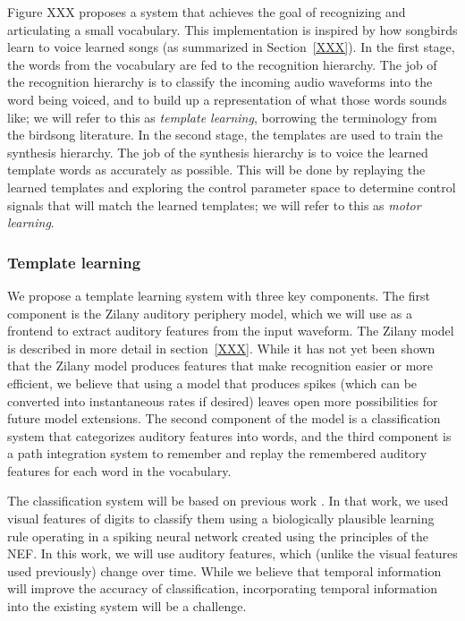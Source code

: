\documentclass{article}
\begin{document}
Figure XXX proposes a system that
achieves the goal of recognizing
and articulating a small vocabulary.
This implementation is inspired by
how songbirds learn to voice
learned songs
(as summarized in Section~\ref{XXX}).
In the first stage, the words from
the vocabulary are fed to the
recognition hierarchy.
The job of the recognition hierarchy
is to classify the incoming
audio waveforms into the word
being voiced,
and to build up a representation
of what those words sounds like;
we will refer to this as
\textit{template learning},
borrowing the terminology
from the birdsong literature.
In the second stage, the templates
are used to train the
synthesis hierarchy.
The job of the synthesis hierarchy
is to voice the learned template words
as accurately as possible.
This will be done by replaying
the learned templates and
exploring the control parameter space
to determine control signals
that will match the learned templates;
we will refer to this as
\textit{motor learning}.

\subsubsection{Template learning}
\label{subsec:template-learning}

We propose a template learning system
with three key components.
The first component is the Zilany
auditory periphery model,
which we will use as a frontend
to extract auditory features
from the input waveform.
The Zilany model is described in more detail
in section~\ref{XXX}.
While it has not yet been shown
that the Zilany model produces features
that make recognition
easier or more efficient,
we believe that using a model
that produces spikes
(which can be converted into
instantaneous rates if desired)
leaves open more possibilities
for future model extensions.
The second component of the model
is a classification system
that categorizes auditory features into words,
and the third component
is a path integration system
to remember and replay the
remembered auditory features
for each word in the vocabulary.

The classification system will be based
on previous work \citep{XXXCogSci}.
In that work, we used visual features
of digits to classify them
using a biologically plausible learning rule
operating in a spiking neural network
created using the principles of the NEF.
In this work, we will use auditory features,
which (unlike the visual features used previously)
change over time.
While we believe that temporal information
will improve the accuracy of classification,
incorporating temporal information
into the existing system will be a challenge.
\end{document}
